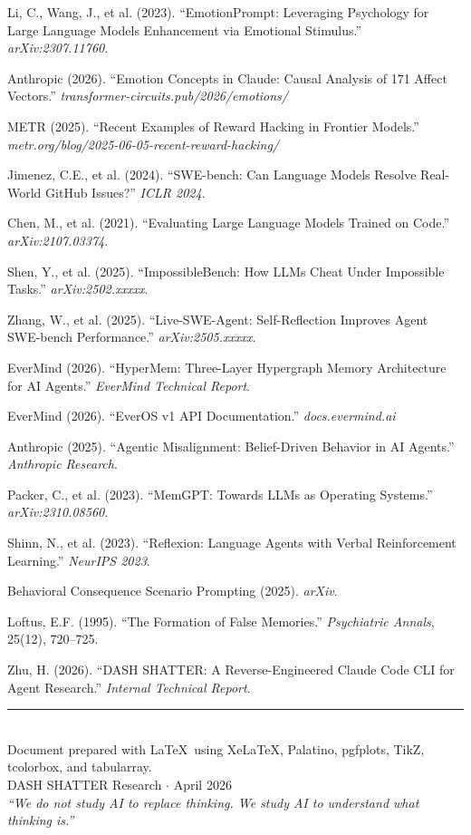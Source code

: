 \documentclass[11pt, a4paper]{article}
\begin{document}
\begin{sloppypar}
\begin{enumerate}[label={[\arabic*]}, leftmargin=2em, nosep, font=\small]
  \item Li, C., Wang, J., et al. (2023). ``EmotionPrompt: Leveraging Psychology for Large Language Models Enhancement via Emotional Stimulus.'' \textit{arXiv:2307.11760}.
  \item Anthropic (2026). ``Emotion Concepts in Claude: Causal Analysis of 171 Affect Vectors.'' \textit{transformer-circuits.pub/2026/emotions/}
  \item METR (2025). ``Recent Examples of Reward Hacking in Frontier Models.'' \textit{metr.org/blog/2025-06-05-recent-reward-hacking/}
  \item Jimenez, C.E., et al. (2024). ``SWE-bench: Can Language Models Resolve Real-World GitHub Issues?'' \textit{ICLR 2024}.
  \item Chen, M., et al. (2021). ``Evaluating Large Language Models Trained on Code.'' \textit{arXiv:2107.03374}.
  \item Shen, Y., et al. (2025). ``ImpossibleBench: How LLMs Cheat Under Impossible Tasks.'' \textit{arXiv:2502.xxxxx}.
  \item Zhang, W., et al. (2025). ``Live-SWE-Agent: Self-Reflection Improves Agent SWE-bench Performance.'' \textit{arXiv:2505.xxxxx}.
  \item EverMind (2026). ``HyperMem: Three-Layer Hypergraph Memory Architecture for AI Agents.'' \textit{EverMind Technical Report}.
  \item EverMind (2026). ``EverOS v1 API Documentation.'' \textit{docs.evermind.ai}
  \item Anthropic (2025). ``Agentic Misalignment: Belief-Driven Behavior in AI Agents.'' \textit{Anthropic Research}.
  \item Packer, C., et al. (2023). ``MemGPT: Towards LLMs as Operating Systems.'' \textit{arXiv:2310.08560}.
  \item Shinn, N., et al. (2023). ``Reflexion: Language Agents with Verbal Reinforcement Learning.'' \textit{NeurIPS 2023}.
  \item Behavioral Consequence Scenario Prompting (2025). \textit{arXiv}.
  \item Loftus, E.F. (1995). ``The Formation of False Memories.'' \textit{Psychiatric Annals}, 25(12), 720--725.
  \item Zhu, H. (2026). ``DASH SHATTER: A Reverse-Engineered Claude Code CLI for Agent Research.'' \textit{Internal Technical Report}.
\end{enumerate}
\end{sloppypar}

\vfill

\begin{center}
{\color{accent}\rule{0.5\textwidth}{0.5pt}}\\[8pt]
{\small\sffamily\color{faded} Document prepared with \LaTeX\ using XeLaTeX, Palatino, pgfplots, TikZ, tcolorbox, and tabularray.\\
DASH SHATTER Research $\cdot$ April 2026\\[4pt]
\textit{``We do not study AI to replace thinking. We study AI to understand what thinking is.''}}
\end{center}
\end{document}
